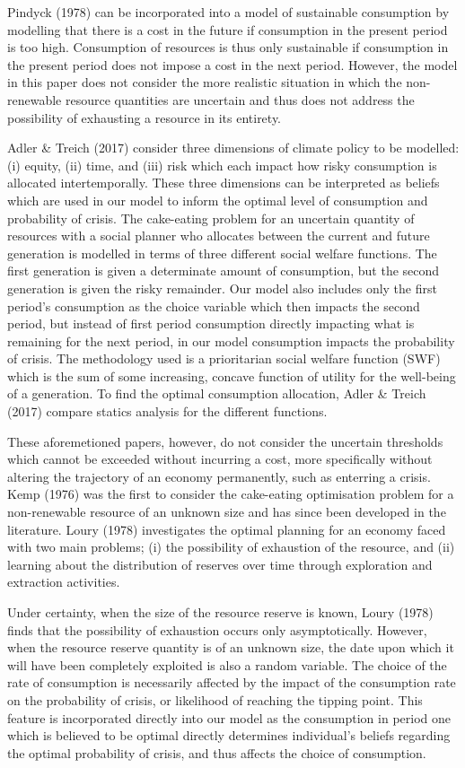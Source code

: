 \documentclass[11pt,preprint, authoryear]{elsarticle}
\numberwithin{equation}{section}
\numberwithin{figure}{section}
\numberwithin{table}{section}
\begin{document}
Pindyck (1978) can be incorporated into a model of sustainable
consumption by modelling that there is a cost in the future if
consumption in the present period is too high. Consumption of resources
is thus only sustainable if consumption in the present period does not
impose a cost in the next period. However, the model in this paper does
not consider the more realistic situation in which the non-renewable
resource quantities are uncertain and thus does not address the
possibility of exhausting a resource in its entirety.

Adler \& Treich (2017) consider three dimensions of climate policy to be
modelled: (i) equity, (ii) time, and (iii) risk which each impact how
risky consumption is allocated intertemporally. These three dimensions
can be interpreted as beliefs which are used in our model to inform the
optimal level of consumption and probability of crisis. The cake-eating
problem for an uncertain quantity of resources with a social planner who
allocates between the current and future generation is modelled in terms
of three different social welfare functions. The first generation is
given a determinate amount of consumption, but the second generation is
given the risky remainder. Our model also includes only the first
period's consumption as the choice variable which then impacts the
second period, but instead of first period consumption directly
impacting what is remaining for the next period, in our model
consumption impacts the probability of crisis. The methodology used is a
prioritarian social welfare function (SWF) which is the sum of some
increasing, concave function of utility for the well-being of a
generation. To find the optimal consumption allocation, Adler \& Treich
(2017) compare statics analysis for the different functions.

These aforemetioned papers, however, do not consider the uncertain
thresholds which cannot be exceeded without incurring a cost, more
specifically without altering the trajectory of an economy permanently,
such as enterring a crisis. Kemp (1976) was the first to consider the
cake-eating optimisation problem for a non-renewable resource of an
unknown size and has since been developed in the literature. Loury
(1978) investigates the optimal planning for an economy faced with two
main problems; (i) the possibility of exhaustion of the resource, and
(ii) learning about the distribution of reserves over time through
exploration and extraction activities.

Under certainty, when the size of the resource reserve is known, Loury
(1978) finds that the possibility of exhaustion occurs only
asymptotically. However, when the resource reserve quantity is of an
unknown size, the date upon which it will have been completely exploited
is also a random variable. The choice of the rate of consumption is
necessarily affected by the impact of the consumption rate on the
probability of crisis, or likelihood of reaching the tipping point. This
feature is incorporated directly into our model as the consumption in
period one which is believed to be optimal directly determines
individual's beliefs regarding the optimal probability of crisis, and
thus affects the choice of consumption.
\end{document}
